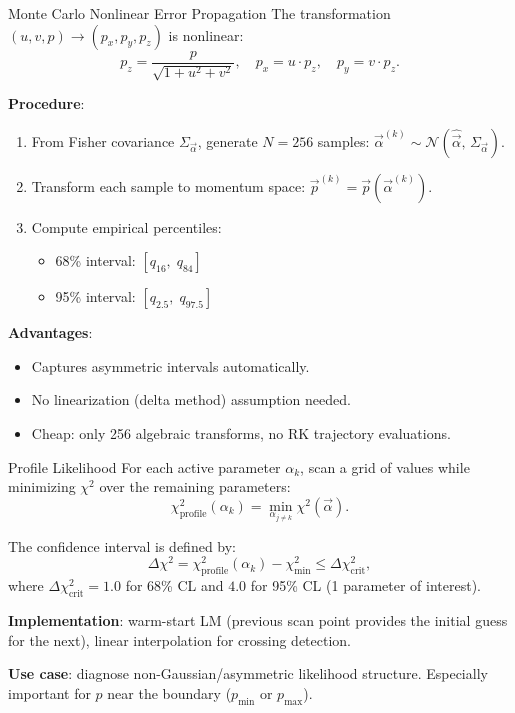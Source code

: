 \documentclass[aspectratio=169]{beamer}
\begin{document}
\begin{frame}{Monte Carlo Nonlinear Error Propagation}
\small
The transformation $(u, v, p) \to (p_x, p_y, p_z)$ is nonlinear:
\[
p_z = \frac{p}{\sqrt{1 + u^2 + v^2}}, \quad p_x = u \cdot p_z, \quad p_y = v \cdot p_z.
\]

\textbf{Procedure}:
\begin{enumerate}
\item From Fisher covariance $\Sigma_{\vec{\alpha}}$, generate $N = 256$ samples: $\vec{\alpha}^{(k)} \sim \mathcal{N}(\hat{\vec{\alpha}},\, \Sigma_{\vec{\alpha}})$.
\item Transform each sample to momentum space: $\vec{p}^{(k)} = \vec{p}(\vec{\alpha}^{(k)})$.
\item Compute empirical percentiles:
\begin{itemize}
\item 68\% interval: $[q_{16},\; q_{84}]$
\item 95\% interval: $[q_{2.5},\; q_{97.5}]$
\end{itemize}
\end{enumerate}

\textbf{Advantages}:
\begin{itemize}
\item Captures asymmetric intervals automatically.
\item No linearization (delta method) assumption needed.
\item Cheap: only 256 algebraic transforms, no RK trajectory evaluations.
\end{itemize}
\end{frame}

\begin{frame}{Profile Likelihood}
\small
For each active parameter $\alpha_k$, scan a grid of values while minimizing $\chi^2$ over the remaining parameters:
\[
\chi^2_\mathrm{profile}(\alpha_k) = \min_{\alpha_{j \neq k}} \chi^2(\vec{\alpha}).
\]

The confidence interval is defined by:
\[
\Delta\chi^2 = \chi^2_\mathrm{profile}(\alpha_k) - \chi^2_\mathrm{min} \leq \Delta\chi^2_\mathrm{crit},
\]
where $\Delta\chi^2_\mathrm{crit} = 1.0$ for 68\% CL and $4.0$ for 95\% CL (1 parameter of interest).

\vspace{0.2cm}
\textbf{Implementation}: warm-start LM (previous scan point provides the initial guess for the next), linear interpolation for crossing detection.

\vspace{0.2cm}
\textbf{Use case}: diagnose non-Gaussian/asymmetric likelihood structure. Especially important for $p$ near the boundary ($p_\mathrm{min}$ or $p_\mathrm{max}$).
\end{frame}
\end{document}
